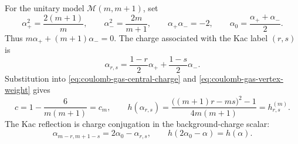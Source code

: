 For the unitary model \(\mathcal M(m,m+1)\), set
\begin{equation}
  \alpha_+^2=\frac{2(m+1)}{m},
  \qquad
  \alpha_-^2=\frac{2m}{m+1},
  \qquad
  \alpha_+\alpha_-=-2,
  \qquad
  \alpha_0=\frac{\alpha_++\alpha_-}{2}.
  \label{eq:coulomb-gas-unitary-alpha}
\end{equation}
Thus \(m\alpha_+ +(m+1)\alpha_-=0\).  The charge associated with the Kac label
\((r,s)\) is
\begin{equation}
  \alpha_{r,s}
  =
  \frac{1-r}{2}\alpha_+
  +
  \frac{1-s}{2}\alpha_- .
  \label{eq:coulomb-gas-kac-charge}
\end{equation}
Substitution into \eqref{eq:coulomb-gas-central-charge} and
\eqref{eq:coulomb-gas-vertex-weight} gives
\begin{equation}
  c=1-\frac{6}{m(m+1)}=c_m,
  \qquad
  h(\alpha_{r,s})
  =
  \frac{\bigl((m+1)r-ms\bigr)^2-1}{4m(m+1)}
  =
  h_{r,s}^{(m)}.
  \label{eq:coulomb-gas-kac-weight}
\end{equation}
The Kac reflection is charge conjugation in the background-charge scalar:
\[
  \alpha_{m-r,m+1-s}=2\alpha_0-\alpha_{r,s},
  \qquad
  h(2\alpha_0-\alpha)=h(\alpha).
\]

